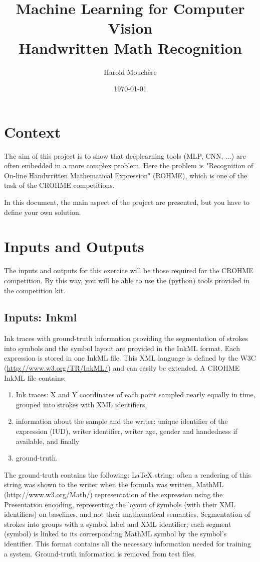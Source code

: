 \documentclass{article}
\title{Machine Learning for Computer Vision\\ Handwritten Math Recognition}
\author{Harold Mouchère}
\date{\today}
\begin{document}
\newcommand{\xmlelt}[1]{$<$#1$>$}

\maketitle

\section{Context}

The aim of this project is to show that deeplearning tools (MLP, CNN, ...) are often embedded in a more complex problem.
Here the problem is "Recognition of On-line Handwritten Mathematical Expression" (ROHME), which is one of the task of the CROHME competitions. 

In this document, the main aspect of the project are presented, but you have to define your own solution.

\section{Inputs and Outputs}
The inputs and outputs for this exercice will be those required for the CROHME competition. By this way, you will be able to use the (python) tools provided in the competition kit.

\subsection{Inputs: Inkml}

Ink traces with ground-truth information providing the segmentation of strokes into symbols and the symbol layout are provided in the InkML format. 
Each expression is stored in one InkML file. 
This XML language is defined by the W3C (\url{http://www.w3.org/TR/InkML/}) and can easily be extended. 
A CROHME InkML file contains: 
\begin{enumerate}
\item  Ink traces: X and Y coordinates of each point sampled nearly equally in time, grouped into strokes with XML identifiers, 
\item  information about the sample and the writer: unique identifier of the expression (IUD), writer identifier, writer age, gender and handedness if available, and finally 
\item  ground-truth. 
\end{enumerate}
The ground-truth contains the following:
LaTeX string: often a rendering of this string was shown to the writer when the formula was written,
MathML (http://www.w3.org/Math/) representation of the expression using the Presentation encoding, representing the layout of symbols (with their XML identifiers) on baselines, and not their mathematical semantics,
Segmentation of strokes into groups with a symbol label and XML identifier; each segment (symbol) is linked to its corresponding MathML symbol by the symbol’s identifier.
This format contains all the necessary information needed for training a system. 
Ground-truth information is removed from test files.
\end{document}
